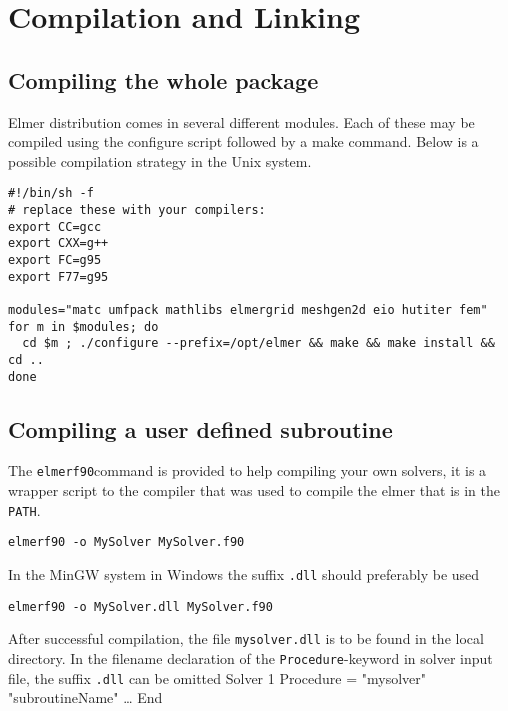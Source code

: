 \chapter{Compilation and Linking}

\section{Compiling the whole package}

Elmer distribution comes in several different modules. Each of these may be compiled using
the configure script followed by a make command. 
Below is a possible compilation strategy in the Unix system. 
\begin{verbatim}
#!/bin/sh -f
# replace these with your compilers:
export CC=gcc
export CXX=g++
export FC=g95
export F77=g95

modules="matc umfpack mathlibs elmergrid meshgen2d eio hutiter fem" 
for m in $modules; do
  cd $m ; ./configure --prefix=/opt/elmer && make && make install && cd .. 
done
\end{verbatim}

\section{Compiling a user defined subroutine}

The \texttt{elmerf90}command is provided to help compiling your own solvers, it is a wrapper script to the 
compiler that was used to compile the elmer that is in the \texttt{PATH}.
\begin{verbatim}
elmerf90 -o MySolver MySolver.f90
\end{verbatim}
In the MinGW system in Windows the suffix \texttt{.dll} should preferably be used
\begin{verbatim}
elmerf90 -o MySolver.dll MySolver.f90
\end{verbatim}

After successful compilation, the file \texttt{mysolver.dll} is to be found in the local directory. 
In the filename declaration of the \texttt{Procedure}-keyword in solver input file, the suffix \texttt{.dll} can be omitted
\ttbegin
Solver 1
  Procedure = "mysolver" "subroutineName"
  \ldots
End
\ttend